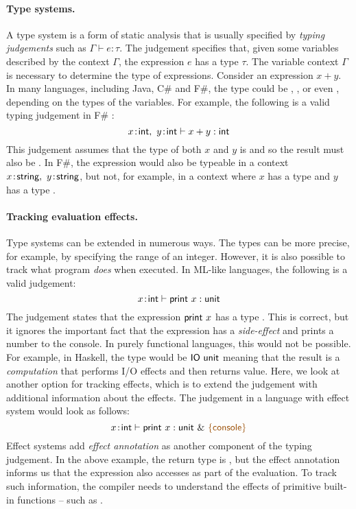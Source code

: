 \paragraph{Type systems.}
A type system is a form of static analysis that is usually specified by \emph{typing judgements}
such as $\Gamma \vdash e : \tau$. The judgement specifies that, given some variables described by
the context $\Gamma$, the expression $e$ has a type $\tau$.
The variable context $\Gamma$ is necessary to determine the type of expressions. Consider an
expression $x + y$. In many languages, including Java, C\# and F\#, the type could be ,
, or even , depending on the types of the variables. For example, 
the following is a valid typing judgement in F\# \cite{app-fsharp}:
%
\begin{equation*}
x\!:\!\ident{int},~y\!:\!\ident{int} \vdash x+y : \ident{int}
\end{equation*}
%
This judgement assumes that the type of both $x$ and $y$ is  and so the result must also
be . In F\#, the expression would also be typeable in a context $x\!:\!\textnormal{\sffamily string},~y\!:\!\textnormal{\sffamily string}$,
but not, for example, in a context where $x$ has a type  and $y$ has a type .

\paragraph{Tracking evaluation effects.}
Type systems can be extended in numerous ways. The types can be more precise, for example, by specifying
the range of an integer. However, it is also possible to track what program \emph{does} when executed.
In ML-like languages, the following is a valid judgement:
%
\begin{equation*}
x\!:\!\textnormal{\sffamily int} \vdash \textnormal{\sffamily print}~x : \textnormal{\sffamily unit}
\end{equation*}
%
The judgement states that the expression $\textnormal{\sffamily print}~x$ has a type . This is correct,
but it ignores the important fact that the expression has a \emph{side-effect} and prints a number
to the console. In purely functional languages, this would not be possible. For example, in Haskell,
the type would be $\textnormal{\sffamily IO unit}$ meaning that the result is a \emph{computation} that performs I/O
effects and then returns  value. Here, we look at another option for tracking effects, 
which is to extend the judgement with additional information about the effects. The judgement in a 
language with effect system would look as follows:
%
\begin{equation*}
x\!:\!\ident{int} \vdash \ident{print}~x : \ident{unit}~\&~\aclrd{\{ \ident{console} \}}
\end{equation*}
%
Effect systems add \emph{effect annotation} as another component of the typing judgement. In the above
example, the return type is , but the effect annotation informs us that the expression
also accesses  as part of the evaluation. To track such information, the compiler needs
to understand the effects of primitive built-in functions -- such as .

